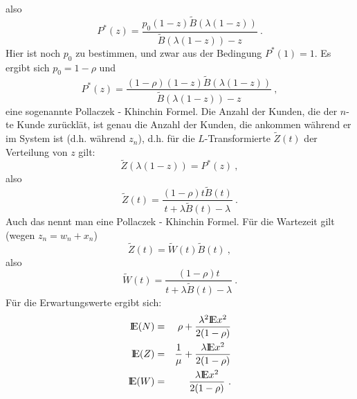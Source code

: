 also
\begin{displaymath}
P^{*}(z) = \frac{p_{0}(1-z) \tilde B ( \lambda (1-z))}{ \tilde B (
\lambda(1-z)) - z} ~.
\end{displaymath}
Hier ist noch $p_{0}$ zu bestimmen, und zwar aus der Bedingung $P^{*}(1) =
1$. Es ergibt sich $p_{0} = 1 - \rho$ und
\begin{displaymath}
P^{*}(z) = \frac{(1- \rho)(1-z) \tilde B ( \lambda (1-z))}{ \tilde B (
\lambda(1-z)) - z} ~,
\end{displaymath}
eine sogenannte Pollaczek - Khinchin Formel. Die Anzahl der Kunden, die der $n$-te
Kunde zurücklä\3t, ist genau die Anzahl der Kunden, die ankommen
während er im System ist (d.h. während $z_{n}$), d.h. für die
$L$-Transformierte $ \tilde Z (t)$ der Verteilung von $z$ gilt:
\begin{displaymath}
\tilde Z (\lambda(1-z)) = P^{*}(z) ~,
\end{displaymath}
also
\begin{displaymath}
\tilde Z (t) = \frac{(1- \rho)t \tilde B (t)}{t + \lambda \tilde B (t) -
\lambda} ~.
\end{displaymath}
Auch das nennt man eine Pollaczek - Khinchin Formel. Für die Wartezeit
gilt
(wegen $z_{n} = w_{n} + x_{n}$)
\begin{displaymath}
\tilde Z (t) = \tilde W (t) \tilde B(t) ~,
\end{displaymath}
also
\begin{displaymath}
\tilde W (t) = \frac{(1- \rho)t}{t + \lambda \tilde B (t) - \lambda} ~.
\end{displaymath}
Für die Erwartungswerte ergibt sich:
\begin{eqnarray*}
{\rm I\kern-0.2em E} (N) &=& \rho + \frac{\lambda^{2} {\rm I\kern-0.2em E} x^{2}}{2(1- \rho)} \\
{\rm I\kern-0.2em E} (Z) &=& \frac{1}{\mu} + \frac{\lambda {\rm I\kern-0.2em E} x^{2}}{2(1 - \rho)} \\
{\rm I\kern-0.2em E} (W) &=& \frac{\lambda {\rm I\kern-0.2em E} x^{2}}{2(1 - \rho)} ~.
\end{eqnarray*}
